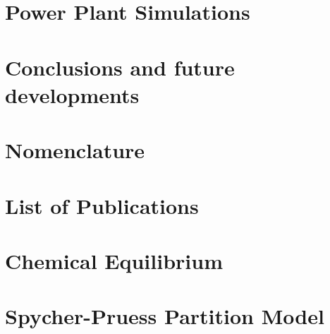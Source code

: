\documentclass{Configuration_Files/PoliMi3i_thesis}
\begin{document}
\chapter{Power Plant Simulations}
\label{ch:process_simulation}%
    

\chapter{Conclusions and future developments}
\label{ch:conclusions}%
    



\chapter*{Nomenclature}        
    
    
\listoffigures

\listoftables

\listoflistings

\chapter*{List of Publications}        
    


\cleardoublepage
{} %
\appendix
\chapter{Chemical Equilibrium}
\label{ch:appendix_a}%
   

\chapter{Spycher-Pruess Partition Model}
\label{ch:appendix_b}%
   
\end{document}
